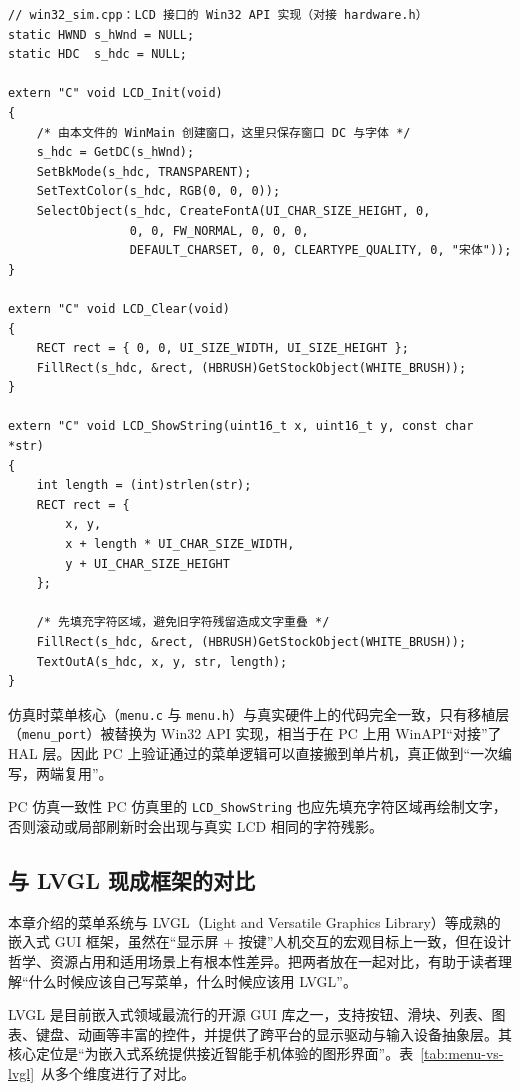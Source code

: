 \begin{lstlisting}[style=c]
// win32_sim.cpp：LCD 接口的 Win32 API 实现（对接 hardware.h）
static HWND s_hWnd = NULL;
static HDC  s_hdc = NULL;

extern "C" void LCD_Init(void)
{
    /* 由本文件的 WinMain 创建窗口，这里只保存窗口 DC 与字体 */
    s_hdc = GetDC(s_hWnd);
    SetBkMode(s_hdc, TRANSPARENT);
    SetTextColor(s_hdc, RGB(0, 0, 0));
    SelectObject(s_hdc, CreateFontA(UI_CHAR_SIZE_HEIGHT, 0,
                 0, 0, FW_NORMAL, 0, 0, 0,
                 DEFAULT_CHARSET, 0, 0, CLEARTYPE_QUALITY, 0, "宋体"));
}

extern "C" void LCD_Clear(void)
{
    RECT rect = { 0, 0, UI_SIZE_WIDTH, UI_SIZE_HEIGHT };
    FillRect(s_hdc, &rect, (HBRUSH)GetStockObject(WHITE_BRUSH));
}

extern "C" void LCD_ShowString(uint16_t x, uint16_t y, const char *str)
{
    int length = (int)strlen(str);
    RECT rect = {
        x, y,
        x + length * UI_CHAR_SIZE_WIDTH,
        y + UI_CHAR_SIZE_HEIGHT
    };

    /* 先填充字符区域，避免旧字符残留造成文字重叠 */
    FillRect(s_hdc, &rect, (HBRUSH)GetStockObject(WHITE_BRUSH));
    TextOutA(s_hdc, x, y, str, length);
}
\end{lstlisting}

仿真时菜单核心（\texttt{menu.c} 与 \texttt{menu.h}）与真实硬件上的代码完全一致，只有移植层（\texttt{menu\_port}）被替换为 Win32 API 实现，相当于在 PC 上用 WinAPI“对接”了 HAL 层。因此 PC 上验证通过的菜单逻辑可以直接搬到单片机，真正做到“一次编写，两端复用”。

\begin{anybox}{PC 仿真一致性}
PC 仿真里的 \texttt{LCD\_ShowString} 也应先填充字符区域再绘制文字，否则滚动或局部刷新时会出现与真实 LCD 相同的字符残影。
\end{anybox}


\subsection{与 LVGL 现成框架的对比}

本章介绍的菜单系统与 LVGL（Light and Versatile Graphics Library）等成熟的嵌入式 GUI 框架，虽然在“显示屏 + 按键”人机交互的宏观目标上一致，但在设计哲学、资源占用和适用场景上有根本性差异。把两者放在一起对比，有助于读者理解“什么时候应该自己写菜单，什么时候应该用 LVGL”。

LVGL 是目前嵌入式领域最流行的开源 GUI 库之一，支持按钮、滑块、列表、图表、键盘、动画等丰富的控件，并提供了跨平台的显示驱动与输入设备抽象层。其核心定位是“为嵌入式系统提供接近智能手机体验的图形界面”。表~\ref{tab:menu-vs-lvgl}~从多个维度进行了对比。


